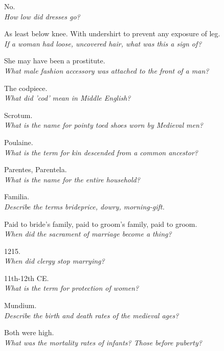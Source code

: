 \documentclass[12pt]{article}
\begin{document}
No.\\

\textit{How low did dresses go?}

As least below knee. With undershirt to prevent any exposure of leg.\\

\textit{If a woman had loose, uncovered hair, what was this a sign of?}

She may have been a prostitute.\\

\textit{What male fashion accessory was attached to the front of a man?}

The codpiece.\\

\textit{What did 'cod' mean in Middle English?}

Scrotum.\\

\textit{What is the name for pointy toed shoes worn by Medieval men?}

Poulaine.\\

\textit{What is the term for kin descended from a common ancestor?}

Parentes, Parentela.\\

\textit{What is the name for the entire household?}

Familia.\\

\textit{Describe the terms brideprice, dowry, morning-gift.}

Paid to bride's family, paid to groom's family, paid to groom.\\

\textit{When did the sacrament of marriage become a thing?}

1215.\\

\textit{When did clergy stop marrying?}

11th-12th CE.\\

\textit{What is the term for protection of women?}

Mundium.\\

\textit{Describe the birth and death rates of the medieval ages?}

Both were high.\\

\textit{What was the mortality rates of infants? Those before puberty?}
\end{document}
